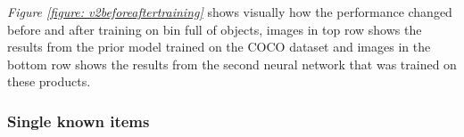 \textit{Figure \ref{figure: v2beforeaftertraining}} shows visually how the performance changed before and after training on bin full of objects, images in top row shows the results from the prior model trained on the COCO dataset and images in the bottom row shows the results from the second neural network that was trained on these products.

\clearpage
\subsubsection{Single known items} \label{sec:v2resontrained}
\begin{figure}[h]
 \centering
 \hfill
 \hfill

\end{figure}
